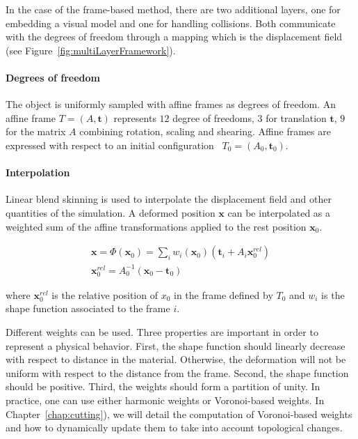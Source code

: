 In the case of the frame-based method, there are two additional layers, one for embedding a visual model and one for handling collisions. 
Both communicate with the degrees of freedom through a mapping which is the displacement field (see Figure~\ref{fig:multiLayerFramework}).

\paragraph{Degrees of freedom}
The object is uniformly sampled with affine frames as degrees of freedom. An affine frame $T=(A,\mathbf{t})$ represents $12$ degree of freedoms, $3$ for translation $\mathbf{t}$, $9$ for the matrix $A$ combining rotation, scaling and shearing. 
Affine frames are expressed with respect to an initial configuration ~$T_{0} = \left(A_{0}, \mathbf{t}_{0}\right)$.

\paragraph{Interpolation}
Linear blend skinning is used to interpolate the displacement field and other quantities of the simulation. A deformed position $\mathbf{x}$ can be interpolated as a weighted sum of the affine transformations applied to the rest position $\mathbf{x}_{0}$.

\begin{equation}
\label{eq:frameBasedDisplacementField}
\begin{array}{l}
\displaystyle \mathbf{x} = \Phi(\mathbf{x}_{0}) = \sum_{i} w_{i}(\mathbf{x}_{0})\left(\mathbf{t}_{i}+A_{i}\mathbf{x}_{0}^{rel}\right) \\
\displaystyle \mathbf{x}_{0}^{rel} = A_{0}^{-1}\left( \mathbf{x}_{0} - \mathbf{t}_{0} \right)
\end{array}
\end{equation}

where $\mathbf{x}_{0}^{rel}$ is the relative position of $x_{0}$ in the frame defined by $T_{0}$ and $w_{i}$ is the shape function associated to the frame $i$.

Different weights can be used. Three properties are important in order to represent a physical behavior. 
First, the shape function should linearly decrease with respect to distance in the material. 
Otherwise, the deformation will not be uniform with respect to the distance from the frame. 
Second, the shape function should be positive. 
Third, the weights should form a partition of unity. 
In practice, one can use either harmonic weights or Voronoi-based weights.
In Chapter~\ref{chap:cutting}), we will detail the computation of Voronoi-based weights and how to dynamically update them to take into account topological changes.

